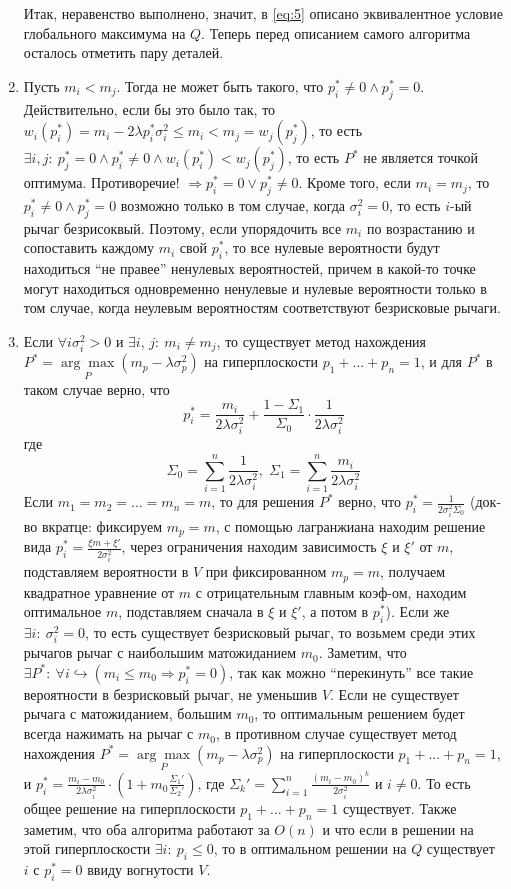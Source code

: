 \documentclass{article}
\begin{document}
\begin{enumerate}
    Итак, неравенство выполнено, значит, в \ref{eq:5} описано эквивалентное условие глобального максимума на $Q$. Теперь перед описанием самого алгоритма осталось отметить пару деталей.
    \item \label{itm:4} Пусть $m_i < m_j$. Тогда не может быть такого, что $p_i^* \neq 0 \land p_j^* = 0$. Действительно, если бы это было так, то $w_i(p_i^*) = m_i - 2 \lambda p_i^* \sigma_i^2 \leq m_i < m_j = w_j(p_j^*)$, то есть $\exists i,j: \: p_j^* = 0 \land p_i^* \neq 0 \land w_i(p_i^*) <  w_j(p_j^*)$, то есть $P^*$ не является точкой оптимума. Противоречие! $\Rightarrow p_i^* = 0 \lor p_j^* \neq 0$. Кроме того, если $m_i = m_j$, то $p_i^* \neq 0 \land p_j^* = 0$ возможно только в том случае, когда $\sigma_i^2 = 0$, то есть $i$-ый рычаг безрисоквый. Поэтому, если упорядочить все $m_i$ по возрастанию и сопоставить каждому $m_i$ свой $p_i^*$, то все нулевые вероятности будут находиться ``не правее'' ненулевых вероятностей, причем в какой-то точке могут находиться одновременно ненулевые и нулевые вероятности только в том случае, когда неулевым вероятностям соответствуют безрисковые рычаги.
    \item\label{itm:5} Если $\forall i \sigma_i^2 > 0$ и $\exists i,\, j: \: m_i \neq m_j$, то существует метод нахождения $P^* = \underset{P}{\arg \max} (m_p - \lambda \sigma_p^2)$ на гиперплоскости $p_1 + ... + p_n = 1$, и для $P^*$ в таком случае верно, что 
    $$p_i^* = \frac{m_i}{2\lambda \sigma_i^2} + \frac{1 - \Sigma_1}{\Sigma_0} \cdot \frac{1}{2 \lambda \sigma_i^2}$$
    где 
    $$\Sigma_0 = \sum_{i=1}^n \frac{1}{2 \lambda \sigma_i^2}, \; \Sigma_1 = \sum_{i=1}^n \frac{m_i}{2 \lambda \sigma_i^2}$$ 
    Если $m_1 = m_2 = ... = m_n = m$, то для решения $P^*$ верно, что $p_i^* = \frac{1}{2\sigma_i^2 \Sigma_0}$ (док-во вкратце: фиксируем $m_p = m$, с помощью лагранжиана находим решение вида $p_i^* = \frac{\xi m + \xi'}{2\sigma_i^2}$, через ограничения находим зависимость $\xi$ и $\xi'$ от $m$, подставляем вероятности в $V$ при фиксированном $m_p = m$, получаем квадратное уравнение от $m$ с отрицательным главным коэф-ом, находим оптимальное $m$, подставляем сначала в $\xi$ и $\xi'$, а потом в $p_i^*$). Если же $\exists i: \: \sigma_i^2 = 0$, то есть существует безрисковый рычаг, то возьмем среди этих рычагов рычаг с наибольшим матожиданием $m_0$. Заметим, что $\exists P^*: \: \forall i \hookrightarrow (m_i \leq m_0 \Rightarrow p_i^* = 0)$, так как можно ``перекинуть'' все такие вероятности в безрисковый рычаг, не уменьшив $V$. Если не существует рычага с матожиданием, большим $m_0$, то оптимальным решением будет всегда нажимать на рычаг с $m_0$, в противном случае существует метод нахождения $P^* = \underset{P}{\arg \max} (m_p - \lambda \sigma_p^2)$ на гиперплоскости $p_1 + ... + p_n = 1$, и $p_i^* = \frac{m_i - m_0}{2 \lambda \sigma_i^2} \cdot \left(1 + m_0 \frac{\Sigma_1'}{\Sigma_2'} \right)$, где $\Sigma_k' = \sum_{i=1}^n \frac{(m_i - m_0)^k}{2 \sigma_i^2}$ и $i \neq 0$. То есть общее решение на гиперплоскости $p_1 + ... + p_n = 1$ существует. Также заметим, что оба алгоритма работают за $O(n)$ и что если в решении на этой гиперплоскости $\exists i: \: p_i \leq 0$, то в оптимальном решении на $Q$ существует $i$ с $p_i^* = 0$ ввиду вогнутости $V$.

\end{enumerate}
\end{document}
